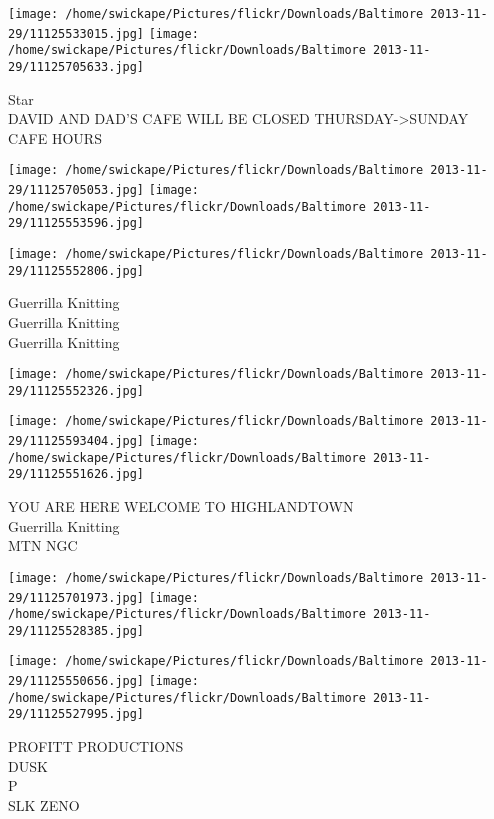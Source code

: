 \documentclass[10pt,letterpaper]{article}
\begin{document}
\vspace{0.25in}
\texttt{[image: /home/swickape/Pictures/flickr/Downloads/Baltimore 2013-11-29/11125533015.jpg]}
\texttt{[image: /home/swickape/Pictures/flickr/Downloads/Baltimore 2013-11-29/11125705633.jpg]}

Star\\
DAVID AND DAD'S CAFE WILL BE CLOSED THURSDAY{-}>SUNDAY\\
CAFE HOURS\\
\pagebreak

\texttt{[image: /home/swickape/Pictures/flickr/Downloads/Baltimore 2013-11-29/11125705053.jpg]}
\texttt{[image: /home/swickape/Pictures/flickr/Downloads/Baltimore 2013-11-29/11125553596.jpg]}

\texttt{[image: /home/swickape/Pictures/flickr/Downloads/Baltimore 2013-11-29/11125552806.jpg]}

Guerrilla Knitting\\
Guerrilla Knitting\\
Guerrilla Knitting\\
\pagebreak

\texttt{[image: /home/swickape/Pictures/flickr/Downloads/Baltimore 2013-11-29/11125552326.jpg]}

\vspace{0.25in}
\texttt{[image: /home/swickape/Pictures/flickr/Downloads/Baltimore 2013-11-29/11125593404.jpg]}
\texttt{[image: /home/swickape/Pictures/flickr/Downloads/Baltimore 2013-11-29/11125551626.jpg]}

YOU ARE HERE WELCOME TO HIGHLANDTOWN\\
Guerrilla Knitting\\
MTN NGC\\
\pagebreak

\texttt{[image: /home/swickape/Pictures/flickr/Downloads/Baltimore 2013-11-29/11125701973.jpg]}
\texttt{[image: /home/swickape/Pictures/flickr/Downloads/Baltimore 2013-11-29/11125528385.jpg]}

\texttt{[image: /home/swickape/Pictures/flickr/Downloads/Baltimore 2013-11-29/11125550656.jpg]}
\texttt{[image: /home/swickape/Pictures/flickr/Downloads/Baltimore 2013-11-29/11125527995.jpg]}

PROFITT PRODUCTIONS\\
DUSK\\
P\\
SLK ZENO\\
\pagebreak
\end{document}
